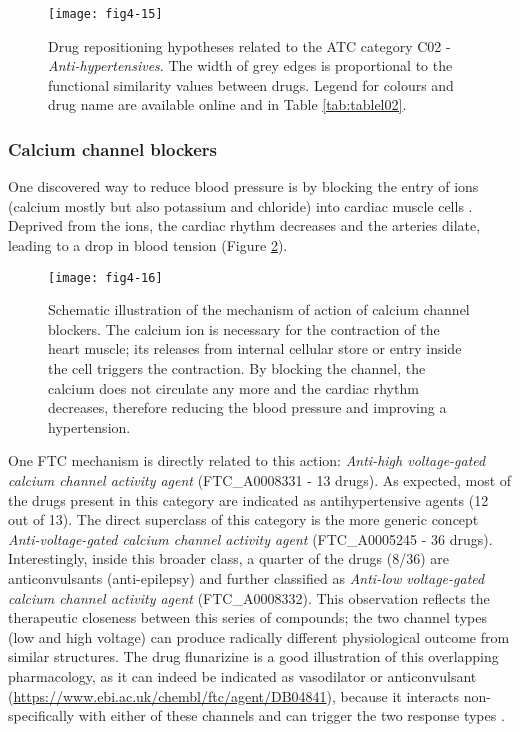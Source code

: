 \begin{figure}[H]
    \centering
    \texttt{[image: fig4-15]}
    \caption{Drug repositioning hypotheses related to the ATC category C02 - \emph{Anti-hypertensives}. The width of grey edges is proportional to the functional similarity values between drugs. Legend for colours and drug name are available online and in Table \ref{tab:tablel02}.}
    \label{fig4-15}
\end{figure}

\subsubsection{Calcium channel blockers}
One discovered way to reduce blood pressure is by blocking the entry of ions (calcium mostly but also potassium and chloride) into cardiac muscle cells \citep{swedberg2005task}. Deprived from the ions, the cardiac rhythm decreases and the arteries dilate, leading to a drop in blood tension (Figure \ref{fig4-16}).

\begin{figure}[H]
    \centering
    \texttt{[image: fig4-16]}
    \caption{Schematic illustration of the mechanism of action of calcium channel blockers. The calcium ion is necessary for the contraction of the heart muscle; its releases from internal cellular store or entry inside the cell triggers the contraction. By blocking the channel, the calcium does not circulate any more and the cardiac rhythm decreases, therefore reducing the blood pressure and improving a hypertension.}
    \label{fig4-16}
\end{figure}

One FTC mechanism is directly related to this action: \emph{Anti-high voltage-gated calcium channel activity agent} (FTC\_A0008331 - 13 drugs). As expected, most of the drugs present in this category are indicated as antihypertensive agents (12 out of 13). The direct superclass of this category is the more generic concept \emph{Anti-voltage-gated calcium channel activity agent} (FTC\_A0005245 - 36 drugs). Interestingly, inside this broader class, a quarter of the drugs (8/36) are anticonvulsants (anti-epilepsy) and further classified as \emph{Anti-low voltage-gated calcium channel activity agent} (FTC\_A0008332). This observation reflects the therapeutic closeness between this series of compounds; the two channel types (low and high voltage) can produce radically different physiological outcome from similar structures. The drug flunarizine is a good illustration of this overlapping pharmacology, as it can indeed be indicated as vasodilator or anticonvulsant (\url{https://www.ebi.ac.uk/chembl/ftc/agent/DB04841}), because it interacts non-specifically with either of these channels and can trigger the two response types \citep{van1978effect}.

